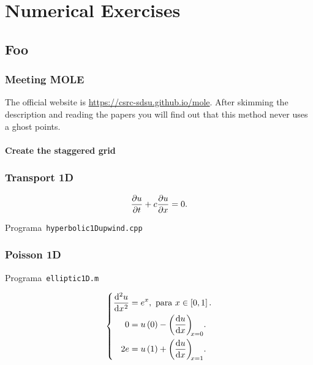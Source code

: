 \part{Numerical Exercises}

\chapter{Foo}

\section{Meeting MOLE}

The official website is \url{https://csrc-sdsu.github.io/mole}.
After skimming the description and reading the papers you will find out that this method never uses a ghost points.

\subsection{Create the staggered grid}

\section{Transport 1D}

\begin{equation*}
    \diffp{u}{t}+c\diffp{u}{x}=
    0.
\end{equation*}

\begin{listing}[ht!]
    \tiny
    \centering
    \caption{Programa~\texttt{hyperbolic1Dupwind.cpp}}
    \label{code:hyperbolic1Dupwind.cpp}
\end{listing}

\section{Poisson 1D}

\begin{listing}[ht!]
    \tiny
    \centering
    \caption{Programa~\texttt{elliptic1D.m}}
    \label{code:elliptic1D.m}
\end{listing}

\begin{equation}\label{eq:poisson1drobindconditions}
    \left\{
    \begin{aligned}
        \diff[2]{u}{x}
         & =e^{x},
        \text{ para }x\in\left[0,1\right].     \\
        0
         & = u\left(0\right)-\diff{u}{x}[x=0]. \\
        2e
         & =u\left(1\right)+\diff{u}{x}[x=1].
    \end{aligned}
    \right.
\end{equation}

